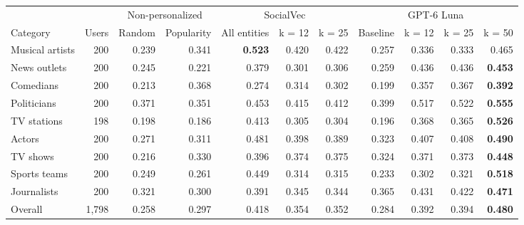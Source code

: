 \begin{tabular}{lrrrrrrrrrr}
\toprule
 &  & \multicolumn{2}{c}{Non-personalized} & \multicolumn{3}{c}{SocialVec} & \multicolumn{4}{c}{GPT-6 Luna} \\
Category & Users & Random & Popularity & All entities & k = 12 & k = 25 & Baseline & k = 12 & k = 25 & k = 50 \\
\midrule
Musical artists & 200 & 0.239 & 0.341 & \textbf{0.523} & 0.420 & 0.422 & 0.257 & 0.336 & 0.333 & 0.465 \\
News outlets & 200 & 0.245 & 0.221 & 0.379 & 0.301 & 0.306 & 0.259 & 0.436 & 0.436 & \textbf{0.453} \\
Comedians & 200 & 0.213 & 0.368 & 0.274 & 0.314 & 0.302 & 0.199 & 0.357 & 0.367 & \textbf{0.392} \\
Politicians & 200 & 0.371 & 0.351 & 0.453 & 0.415 & 0.412 & 0.399 & 0.517 & 0.522 & \textbf{0.555} \\
TV stations & 198 & 0.198 & 0.186 & 0.413 & 0.305 & 0.304 & 0.196 & 0.368 & 0.365 & \textbf{0.526} \\
Actors & 200 & 0.271 & 0.311 & 0.481 & 0.398 & 0.389 & 0.323 & 0.407 & 0.408 & \textbf{0.490} \\
TV shows & 200 & 0.216 & 0.330 & 0.396 & 0.374 & 0.375 & 0.324 & 0.371 & 0.373 & \textbf{0.448} \\
Sports teams & 200 & 0.249 & 0.261 & 0.449 & 0.314 & 0.315 & 0.233 & 0.302 & 0.321 & \textbf{0.518} \\
Journalists & 200 & 0.321 & 0.300 & 0.391 & 0.345 & 0.344 & 0.365 & 0.431 & 0.422 & \textbf{0.471} \\
\midrule
Overall & 1,798 & 0.258 & 0.297 & 0.418 & 0.354 & 0.352 & 0.284 & 0.392 & 0.394 & \textbf{0.480} \\
\bottomrule
\end{tabular}
